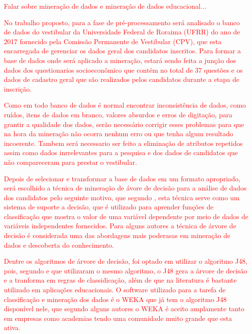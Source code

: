\label{chapter:metodo}

\par
\textcolor{red}{Falar sobre mineração de dados e mineração de dados educacional...}

\par
\textcolor{red}{No trabalho proposto, para a fase de pré-processamento será analisado o banco de dados do vestibular da Universidade Federal de Roraima (UFRR) do ano de 2017 fornecido pela Comissão Permanente de Vestibular (CPV), que esta encarregada de gerenciar os dados geral dos candidatos inscritos. Para formar a base de dados onde será aplicado a mineração, estará sendo feita a junção dos dados dos questionarios socioeconômico que contém no total de 37 questões e os dados de cadastro geral que são realizados pelos candidatos durante a etapa de inscrição.}


\par
\textcolor{red}{Como em todo banco de dados é normal encontrar inconsistência de dados, como ruídos, itens de dados em branco, valores absurdos e erros de digitação, para grantir a qualidade dos dados, serão necessário corrigir esses problemas para que na hora da mineração não ocorra nenhum erro ou que tenha algum resultado incoerente. Tambem será necessario ser feito a eliminação de atributos repetidos assim como dados inrrelevantes para a pesquisa e dos dados de candidatos que não compareceram para prestar o vestibular.}

\par
\textcolor{red}{Depois de selecionar e transformar a base de dados em um formato apropriado, será escolhido a técnica de mineração de ávore de decisão para a análise de dados dos candidatos pelo seguinte motivo, que segundo , esta técnica serve como um sistema de suporte a decisão, que é utilizado para aprender funções de classificação que mostra o valor de uma variável dependente por meio de dados de variáveis independentes fornecidos. Para alguns autores a técnica de árvore de decisão é considerada uma das abordagens mais poderasas em mineração de dados e descoberta do conhecimento.}

\par
\textcolor{red}{Dentre os algoritmos de árvore de decisão, foi optado em utilizar o algoritmo J48, pois, segundo  e  que utilizaram o mesmo algoritmo, o J48 gera a árvore de decisão e a tranforma em regras de classidicação, além de que na literatura é bastante utilizado em aplicações educacionais. O software utilizado para a tarefa de classificação e mineração dos dados é o WEKA que já tem o algoritmo J48 disponível nele, que segundo alguns autores o WEKA é aceito amplamente tanto em empresas como academias tendo uma comunidade muito grande que esta ativa.}

